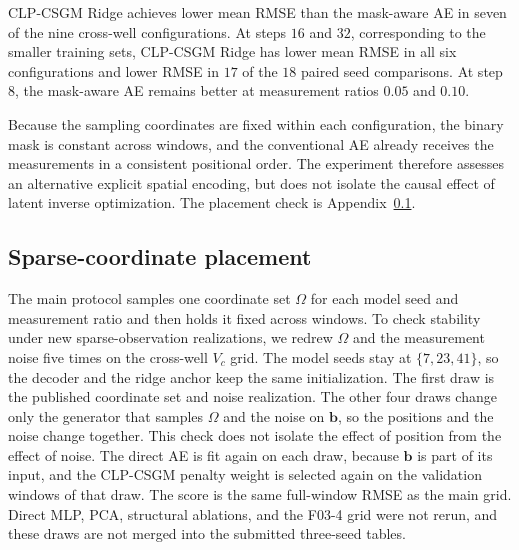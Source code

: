 CLP-CSGM Ridge achieves lower mean RMSE than the mask-aware AE in seven of
the nine cross-well configurations. At steps $16$ and $32$, corresponding to
the smaller training sets, CLP-CSGM Ridge has lower mean RMSE in all six
configurations and lower RMSE in $17$ of the $18$ paired seed comparisons.
At step $8$, the mask-aware AE remains better at measurement ratios $0.05$
and $0.10$.

Because the sampling coordinates are fixed within each configuration, the
binary mask is constant across windows, and the conventional AE already
receives the measurements in a consistent positional order. The experiment
therefore assesses an alternative explicit spatial encoding, but does not
isolate the causal effect of latent inverse optimization. The placement
check is Appendix~\ref{app:crosswell_omega_placement}.

\subsection{Sparse-coordinate placement}
\label{app:crosswell_omega_placement}

The main protocol samples one coordinate set $\Omega$ for each model seed and
measurement ratio and then holds it fixed across windows. To check stability
under new sparse-observation realizations, we redrew $\Omega$ and the
measurement noise five times on the cross-well $V_c$ grid.
The model seeds stay at $\{7,23,41\}$, so the decoder and the ridge anchor
keep the same initialization. The first draw is the published coordinate set
and noise realization.
The other four draws change only the generator that samples $\Omega$ and the
noise on $\boldsymbol{b}$, so the positions and the noise change together.
This check does not isolate the effect of position from the effect of noise.
The direct AE is fit again on each draw, because
$\boldsymbol{b}$ is part of its input, and the CLP-CSGM penalty weight is
selected again on the validation windows of that draw. The score is the same
full-window RMSE as the main grid. Direct MLP, PCA, structural ablations, and
the F03-4 grid were not rerun, and these draws are not merged into the
submitted three-seed tables.

\begin{table}[htbp]
  \centering
  \caption{Cross-well CLP-CSGM Ridge versus AE $[\boldsymbol{u},\boldsymbol{b}]$
  across five sparse-coordinate placements and the three paper seeds
  ($n=15$ per cell). RMSE values are means over those comparisons.
  Positive mean $\Delta\mathrm{RMSE}$ (AE $-$ CLP) favors CLP-CSGM Ridge.
  Wins count comparisons with strictly lower RMSE.}
  \label{tab:crosswell_omega_placement}
  \small
\end{table}


